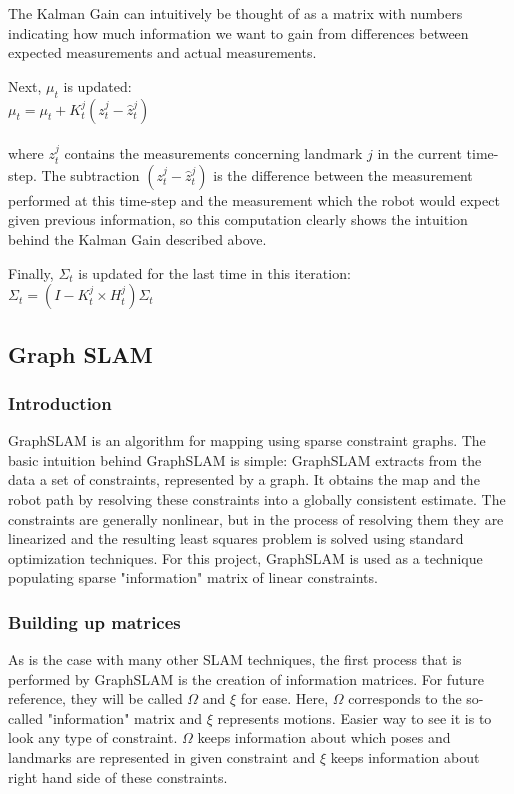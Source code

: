 \documentclass{ba-kecs}
\numberwithin{figure}{section}
\numberwithin{equation}{section}
\begin{document}
The Kalman Gain can intuitively be thought of as a matrix with numbers indicating how much information we want to gain from differences between expected measurements and actual measurements. 

Next, $\mu_t$ is updated: \\

$\mu_t = \mu_t + K_t^j(z_t^j - \hat{z}_t^j)$ \\ \\
where $z_t^j$ contains the measurements concerning landmark $j$ in the current time-step. The subtraction $(z_t^j - \hat{z}_t^j)$ is the difference between the measurement performed at this time-step and the measurement which the robot would expect given previous information, so this computation clearly shows the intuition behind the Kalman Gain described above.

Finally, $\Sigma_t$ is updated for the last time in this iteration: \\

$\Sigma_t = (I - K_t^j \times H_t^j) \Sigma_t$




\subsection{Graph SLAM}

\subsubsection{Introduction}
GraphSLAM is an algorithm for mapping using sparse constraint graphs. The basic intuition behind GraphSLAM is simple: GraphSLAM extracts from the data a set of constraints, represented by a graph. It obtains the map and the robot path by resolving these constraints into a globally consistent estimate. The constraints are generally nonlinear, but in the process of resolving them they are linearized and the resulting least squares problem is solved using standard optimization techniques\cite{sik}. For this project, GraphSLAM is used as a technique populating sparse "information" matrix of linear constraints.

\subsubsection{Building up matrices}
As is the case with many other SLAM techniques, the first process that is performed by GraphSLAM is the creation of information matrices. For future reference, they will be called $\Omega$ and $\xi$ for ease. Here, $\Omega$ corresponds to the so-called "information" matrix and $\xi$ represents motions. Easier way to see it is to look any type of constraint. $\Omega$ keeps information about which poses and landmarks are represented in given constraint and $\xi$ keeps information about right hand side of these constraints.
	
\end{document}
